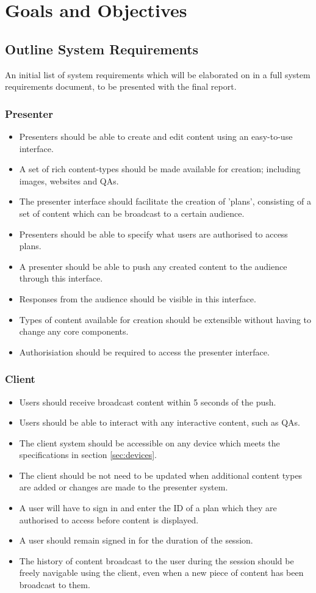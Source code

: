 \documentclass[a4papert,11pt,notitlepage]{ltxdoc}
\begin{document}
\section{Goals and Objectives}
\subsection{Outline System Requirements}
An initial list of system requirements which will be elaborated on in a full system requirements document, to be presented with the final report.

\subsubsection{Presenter}
\begin{itemize}
\item Presenters should be able to create and edit content using an easy-to-use interface.
\item A set of rich content-types should be made available for creation; including images, websites and QAs.
\item The presenter interface should facilitate the creation of 'plans', consisting of a set of content which can be broadcast to a certain audience.
\item Presenters should be able to specify what users are authorised to access plans.
\item A presenter should be able to push any created content to the audience through this interface.
\item Responses from the audience should be visible in this interface.
\item Types of content available for creation should be extensible without having to change any core components.
\item Authorisiation should be required to access the presenter interface.
\end{itemize}
\subsubsection{Client}
\begin{itemize}
\item Users should receive broadcast content within 5 seconds of the push.
\item Users should be able to interact with any interactive content, such as QAs.
\item The client system should be accessible on any device which meets the specifications in section \ref{sec:devices}.
\item The client should be not need to be updated when additional content types are added or changes are made to the presenter system.
\item A user will have to sign in and enter the ID of a plan which they are authorised to access before content is displayed.
\item A user should remain signed in for the duration of the session.
\item The history of content broadcast to the user during the session should be freely navigable using the client, even when a new piece of content has been broadcast to them.
\end{itemize}
\end{document}
